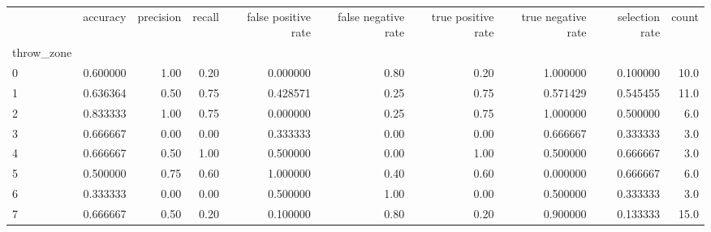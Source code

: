 \begin{tabular}{lrrrrrrrrr}
\toprule
{} &  accuracy &  precision &  recall &  false positive rate &  false negative rate &  true positive rate &  true negative rate &  selection rate &  count \\
throw\_zone &           &            &         &                      &                      &                     &                     &                 &        \\
\midrule
0          &  0.600000 &       1.00 &    0.20 &             0.000000 &                 0.80 &                0.20 &            1.000000 &        0.100000 &   10.0 \\
1          &  0.636364 &       0.50 &    0.75 &             0.428571 &                 0.25 &                0.75 &            0.571429 &        0.545455 &   11.0 \\
2          &  0.833333 &       1.00 &    0.75 &             0.000000 &                 0.25 &                0.75 &            1.000000 &        0.500000 &    6.0 \\
3          &  0.666667 &       0.00 &    0.00 &             0.333333 &                 0.00 &                0.00 &            0.666667 &        0.333333 &    3.0 \\
4          &  0.666667 &       0.50 &    1.00 &             0.500000 &                 0.00 &                1.00 &            0.500000 &        0.666667 &    3.0 \\
5          &  0.500000 &       0.75 &    0.60 &             1.000000 &                 0.40 &                0.60 &            0.000000 &        0.666667 &    6.0 \\
6          &  0.333333 &       0.00 &    0.00 &             0.500000 &                 1.00 &                0.00 &            0.500000 &        0.333333 &    3.0 \\
7          &  0.666667 &       0.50 &    0.20 &             0.100000 &                 0.80 &                0.20 &            0.900000 &        0.133333 &   15.0 \\
\bottomrule
\end{tabular}
